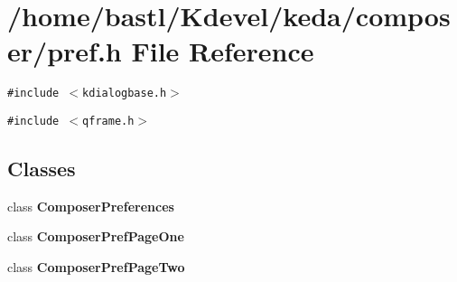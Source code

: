 \section{/home/bastl/Kdevel/keda/composer/pref.h File Reference}
\label{composer_2pref_8h}
{\tt \#include $<$kdialogbase.h$>$}\par
{\tt \#include $<$qframe.h$>$}\par
\subsection*{Classes}
\begin{CompactItemize}
\item 
class {\bf Composer\-Preferences}
\item 
class {\bf Composer\-Pref\-Page\-One}
\item 
class {\bf Composer\-Pref\-Page\-Two}
\end{CompactItemize}
